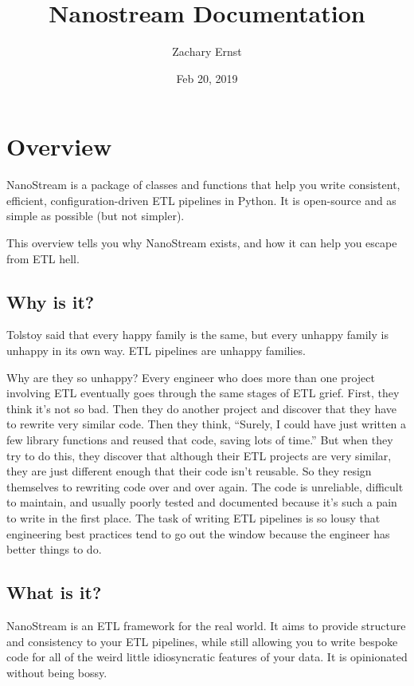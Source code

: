 \documentclass[letterpaper,10pt,english]{sphinxmanual}
\title{Nanostream Documentation}
\date{Feb 20, 2019}
\author{Zachary Ernst}
\begin{document}
\pagestyle{empty}
\maketitle
\pagestyle{plain}
\sphinxtableofcontents
\pagestyle{normal}
\label{\detokenize{index::doc}}



\chapter{Overview}
\label{\detokenize{overview:overview}}\label{\detokenize{overview::doc}}
NanoStream is a package of classes and functions that help you write consistent, efficient, configuration-driven ETL pipelines in Python. It is open-source and
as simple as possible (but not simpler).

This overview tells you why NanoStream exists, and how it can help you escape from ETL hell.


\section{Why is it?}
\label{\detokenize{overview:why-is-it}}
Tolstoy said that every happy family is the same, but every unhappy family is
unhappy in its own way. ETL pipelines are unhappy families.

Why are they so unhappy? Every engineer who does more than one project involving
ETL eventually goes through the same stages of ETL grief. First, they think it’s
not so bad. Then they do another project and discover that they have to rewrite
very similar code. Then they think, “Surely, I could have just written a few
library functions and reused that code, saving lots of time.” But when they try
to do this, they discover that although their ETL projects are very similar,
they are just different enough that their code isn’t reusable. So they resign
themselves to rewriting code over and over again. The code is unreliable,
difficult to maintain, and usually poorly tested and documented because it’s
such a pain to write in the first place. The task of writing ETL pipelines is
so lousy that engineering best practices tend to go out the window because
the engineer has better things to do.


\section{What is it?}
\label{\detokenize{overview:what-is-it}}
NanoStream is an ETL framework for the real world. It aims to provide structure and consistency to your ETL pipelines, while still allowing you to write bespoke code for all of the weird little idiosyncratic features of your data. It is opinionated without being bossy.
\end{document}
